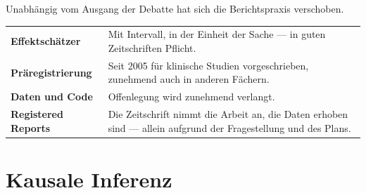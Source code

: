 \begin{merksatz}
Unabhängig vom Ausgang der Debatte hat sich die Berichtspraxis verschoben.

\begin{center}
{\small
\renewcommand{\arraystretch}{1.5}
\begin{tabular}{@{}P{2.6cm}P{6.0cm}@{}}
\toprule
\textbf{Effektschätzer} & Mit Intervall, in der Einheit der Sache --- in guten Zeitschriften Pflicht.\\
\textbf{Präregistrierung} & Seit 2005 für klinische Studien vorgeschrieben, zunehmend auch in anderen Fächern.\\
\textbf{Daten und Code} & Offenlegung wird zunehmend verlangt.\\
\textbf{Registered Reports} & Die Zeitschrift nimmt die Arbeit an,  die Daten erhoben sind --- allein aufgrund der Fragestellung und des Plans.\\
\bottomrule
\end{tabular}}
\end{center}

\begin{center}
\begin{minipage}{0.88\textwidth}
\end{minipage}
\end{center}
\end{merksatz}

\section{Kausale Inferenz}

